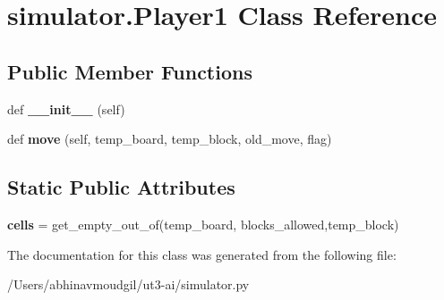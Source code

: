 \hypertarget{classsimulator_1_1_player1}{}\section{simulator.\+Player1 Class Reference}
\label{classsimulator_1_1_player1}
\subsection*{Public Member Functions}
\begin{DoxyCompactItemize}
\item 
def {\bfseries \+\_\+\+\_\+init\+\_\+\+\_\+} (self)\hypertarget{classsimulator_1_1_player1_aed6db868228e85cd0b764eb8f48fef85}{}\label{classsimulator_1_1_player1_aed6db868228e85cd0b764eb8f48fef85}

\item 
def {\bfseries move} (self, temp\+\_\+board, temp\+\_\+block, old\+\_\+move, flag)\hypertarget{classsimulator_1_1_player1_a1077336392acb292bf66e255c92de40d}{}\label{classsimulator_1_1_player1_a1077336392acb292bf66e255c92de40d}

\end{DoxyCompactItemize}
\subsection*{Static Public Attributes}
\begin{DoxyCompactItemize}
\item 
{\bfseries cells} = get\+\_\+empty\+\_\+out\+\_\+of(temp\+\_\+board, blocks\+\_\+allowed,temp\+\_\+block)\hypertarget{classsimulator_1_1_player1_a8a2c5625304540c68ac00037392f6a56}{}\label{classsimulator_1_1_player1_a8a2c5625304540c68ac00037392f6a56}

\end{DoxyCompactItemize}


The documentation for this class was generated from the following file\+:\begin{DoxyCompactItemize}
\item 
/\+Users/abhinavmoudgil/ut3-\/ai/simulator.\+py\end{DoxyCompactItemize}
